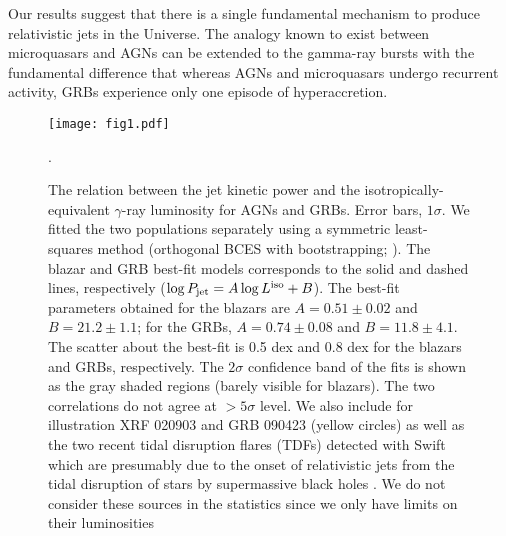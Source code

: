 \documentclass[12pt]{article}
\begin{document}
Our results suggest that there is a single fundamental mechanism to produce relativistic jets in the Universe. The analogy known to exist between microquasars and AGNs \cite{mirabel99,marscher02,merloni03} can be extended to the gamma-ray bursts with the fundamental difference that whereas AGNs and microquasars undergo recurrent activity, GRBs experience only one episode of hyperaccretion.















\clearpage

\begin{figure}[!t]
\centering
\texttt{[image: fig1.pdf]}	%
\caption{The relation between the jet kinetic power and the isotropically-equivalent $\gamma$-ray luminosity for AGNs and GRBs. Error bars, $1\sigma$. 
%
We fitted the two populations separately using a symmetric least-squares method (orthogonal BCES with bootstrapping; ). The blazar and GRB best-fit models corresponds to the solid and dashed lines, respectively ($\log P_{\rm jet} = A \log L^{\rm iso} + B$). The best-fit parameters obtained for the blazars are $A=0.51 \pm 0.02$ and $B=21.2 \pm 1.1$; for the GRBs, $A=0.74 \pm 0.08$ and $B=11.8 \pm 4.1$. The scatter about the best-fit is 0.5 dex and 0.8 dex for the blazars and GRBs, respectively.
The $2\sigma$ confidence band of the fits is shown as the gray shaded regions (barely visible for blazars). The two correlations do not agree at $>5\sigma$ level.
%
We also include for illustration XRF 020903 and GRB 090423 (yellow circles) as well as the two recent tidal disruption flares (TDFs) detected with Swift which are presumably due to the onset of relativistic jets from the tidal disruption of stars by supermassive black holes \cite{tdfs}. We do not consider these sources in the statistics since we only have limits on their luminosities}.
\label{fig:main}
\end{figure}
\end{document}
